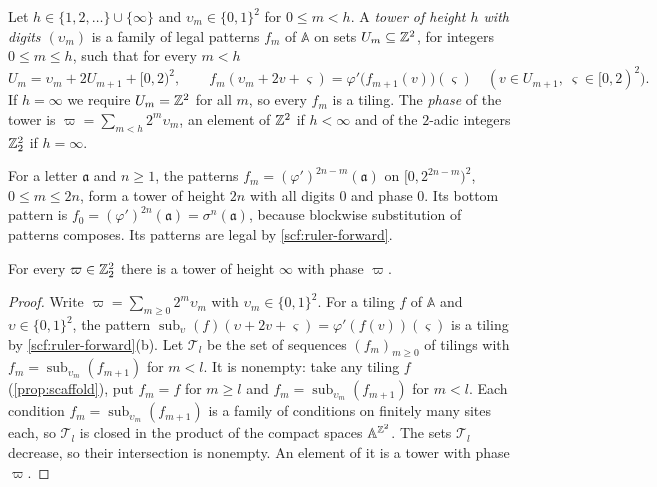 \begin{definition}[Towers]\label{fam:def-tower}
Let $h\in\{1,2,\dots\}\cup\{\infty\}$ and $\upsilon_m\in\{0,1\}^2$ for $0\le m<h$. A \emph{tower of height $h$ with digits $(\upsilon_m)$} is a family of legal patterns $f_m$ of $\mathbb A$ on sets $U_m\subseteq\mathbb{Z}^2$, for integers $0\le m\le h$, such that for every $m<h$
\[
U_m=\upsilon_m+2U_{m+1}+[0,2)^2,\qquad f_m(\upsilon_m+2v+\varsigma)=\varphi'\bigl(f_{m+1}(v)\bigr)(\varsigma)\quad(v\in U_{m+1},\ \varsigma\in[0,2)^2).
\]
If $h=\infty$ we require $U_m=\mathbb{Z}^2$ for all $m$, so every $f_m$ is a tiling. The \emph{phase} of the tower is $\varpi=\sum_{m<h}2^m\upsilon_m$, an element of $\mathbb{Z}^2$ if $h<\infty$ and of the $2$-adic integers $\mathbb{Z}_2^2$ if $h=\infty$.
\end{definition}

For a letter $\mathfrak a$ and $n\ge1$, the patterns $f_m=(\varphi')^{2n-m}(\mathfrak a)$ on $[0,2^{2n-m})^2$, $0\le m\le 2n$, form a tower of height $2n$ with all digits $0$ and phase $0$. Its bottom pattern is $f_0=(\varphi')^{2n}(\mathfrak a)=\sigma^n(\mathfrak a)$, because blockwise substitution of patterns composes. Its patterns are legal by \cref{scf:ruler-forward}.

\begin{lemma}\label{fam:tower-exists}
For every $\varpi\in\mathbb{Z}_2^2$ there is a tower of height $\infty$ with phase $\varpi$.
\end{lemma}

\begin{proof}
Write $\varpi=\sum_{m\ge0}2^m\upsilon_m$ with $\upsilon_m\in\{0,1\}^2$. For a tiling $f$ of $\mathbb A$ and $\upsilon\in\{0,1\}^2$, the pattern $\operatorname{sub}_\upsilon(f)(\upsilon+2v+\varsigma)=\varphi'(f(v))(\varsigma)$ is a tiling by \cref{scf:ruler-forward}(b). Let $\mathcal T_l$ be the set of sequences $(f_m)_{m\ge0}$ of tilings with $f_m=\operatorname{sub}_{\upsilon_m}(f_{m+1})$ for $m<l$. It is nonempty: take any tiling $f$ (\cref{prop:scaffold}), put $f_m=f$ for $m\ge l$ and $f_m=\operatorname{sub}_{\upsilon_m}(f_{m+1})$ for $m<l$. Each condition $f_m=\operatorname{sub}_{\upsilon_m}(f_{m+1})$ is a family of conditions on finitely many sites each, so $\mathcal T_l$ is closed in the product of the compact spaces $\mathbb A^{\mathbb{Z}^2}$. The sets $\mathcal T_l$ decrease, so their intersection is nonempty. An element of it is a tower with phase $\varpi$.
\end{proof}

